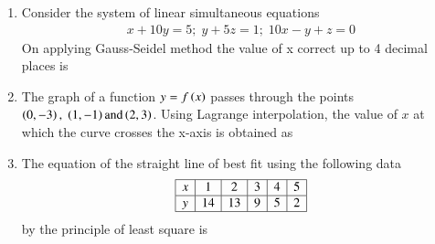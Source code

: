 \documentclass[journal,,12pt,onecolumn]{IEEEtran}
\theoremstyle{remark}
\begin{document}
\begin{enumerate}
\begin{enumerate}
\end{enumerate}
\bigskip
\item Consider the system of linear simultaneous equations
\begin{align*}
    x+10y=5;\;y+5z=1;\;10x-y+z=0
\end{align*}
On applying Gauss-Seidel method the value of x correct up to 4 decimal places is
\begin{enumerate}
\end{enumerate}
\bigskip
\item The graph of a function $y=f\left(x\right)$ passes through the points $\left(0,-3\right),\;\left(1,-1\right)\text{and} \left(2,3\right)$. Using Lagrange interpolation, the value of $x$ at which the curve crosses the x-axis is obtained as
\begin{enumerate}
\end{enumerate}
\bigskip
\item The equation of the straight line of best fit using the following data
\[
\begin{array}{|c|c|c|c|c|c|}
\hline
x & 1 & 2 & 3 & 4 & 5 \\
\hline
y & 14 & 13 & 9 & 5 & 2 \\
\hline
\end{array}
\]
by the principle of least square is
\begin{enumerate}
\end{enumerate}
\end{enumerate}
\end{document}

